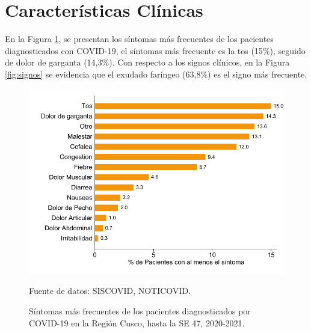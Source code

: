 \documentclass[12pt,a4paper,openany]{book}
\begin{document}
\cleardoublepage


\clearpage

\section*{Características Clínicas}


\noindent En la Figura \ref{fig:sintomas}, se presentan los síntomas más frecuentes de los pacientes diagnosticados con COVID-19, el síntomas más frecuente es la tos (15$\%$), seguido de dolor de garganta (14,3$\%$). Con respecto a los signos clínicos, en la Figura \ref{fig:signos} se evidencia que el exudado faríngeo (63,8$\%$) es el signo más frecuente. 

\begin{figure}[h]
	\caption{Síntomas más frecuentes de los pacientes diagnosticados por COVID-19 en la Región Cusco, hasta la SE 47, 2020-2021.  }\label{fig:sintomas}
	\begin{center}
		\includegraphics[width=0.85\linewidth]{../figuras/figura_sintoma.pdf}
	\end{center}
	{\footnotesize {Fuente de datos: SISCOVID, NOTICOVID.}}
\end{figure}
\end{document}
